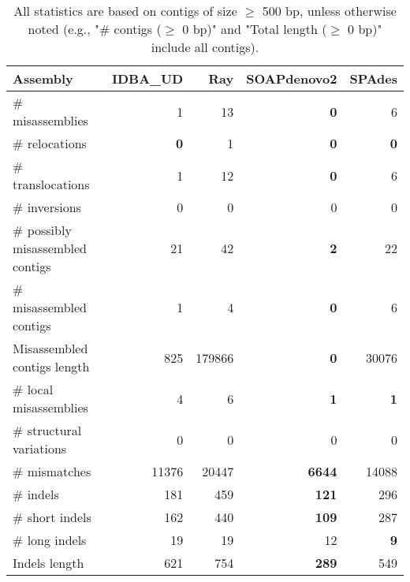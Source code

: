 \documentclass[12pt,a4paper]{article}
\begin{document}
\begin{table}[ht]
\begin{center}
\caption{All statistics are based on contigs of size $\geq$ 500 bp, unless otherwise noted (e.g., "\# contigs ($\geq$ 0 bp)" and "Total length ($\geq$ 0 bp)" include all contigs).}
\begin{tabular}{|l*{4}{|r}|}
\hline
Assembly & IDBA\_UD & Ray & SOAPdenovo2 & SPAdes \\ \hline
\# misassemblies & 1 & 13 & {\bf 0} & 6 \\ \hline
\hspace{5mm}\# relocations & {\bf 0} & 1 & {\bf 0} & {\bf 0} \\ \hline
\hspace{5mm}\# translocations & 1 & 12 & {\bf 0} & 6 \\ \hline
\hspace{5mm}\# inversions & 0 & 0 & 0 & 0 \\ \hline
\# possibly misassembled contigs & 21 & 42 & {\bf 2} & 22 \\ \hline
\# misassembled contigs & 1 & 4 & {\bf 0} & 6 \\ \hline
Misassembled contigs length & 825 & 179866 & {\bf 0} & 30076 \\ \hline
\# local misassemblies & 4 & 6 & {\bf 1} & {\bf 1} \\ \hline
\# structural variations & 0 & 0 & 0 & 0 \\ \hline
\# mismatches & 11376 & 20447 & {\bf 6644} & 14088 \\ \hline
\# indels & 181 & 459 & {\bf 121} & 296 \\ \hline
\hspace{5mm}\# short indels & 162 & 440 & {\bf 109} & 287 \\ \hline
\hspace{5mm}\# long indels & 19 & 19 & 12 & {\bf 9} \\ \hline
Indels length & 621 & 754 & {\bf 289} & 549 \\ \hline
\end{tabular}
\end{center}
\end{table}
\end{document}
